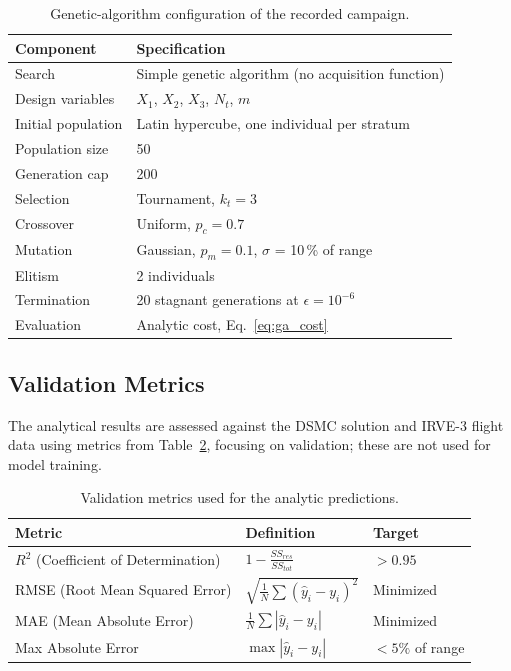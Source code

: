 \begin{table}[H]
    \centering
    \caption{Genetic-algorithm configuration of the recorded campaign.}
    \label{tab:ga_hparams}
    \begin{tabular}{|l|l|}
        \hline
        \textbf{Component} & \textbf{Specification} \\ \hline
        Search & Simple genetic algorithm (no acquisition function) \\ \hline
        Design variables & $X_1$, $X_2$, $X_3$, $N_t$, $m$ \\ \hline
        Initial population & Latin hypercube, one individual per stratum \\ \hline
        Population size & 50 \\ \hline
        Generation cap & 200 \\ \hline
        Selection & Tournament, $k_t = 3$ \\ \hline
        Crossover & Uniform, $p_c = 0.7$ \\ \hline
        Mutation & Gaussian, $p_m = 0.1$, $\sigma$ = 10\,\% of range \\ \hline
        Elitism & 2 individuals \\ \hline
        Termination & 20 stagnant generations at $\epsilon = 10^{-6}$ \\ \hline
        Evaluation & Analytic cost, Eq.~\eqref{eq:ga_cost} \\ \hline
    \end{tabular}
\end{table}

\subsection{Validation Metrics}
The analytical results are assessed against the DSMC solution and IRVE-3 flight data using metrics from Table~\ref{tab:ml_metrics}, focusing on validation; these are not used for model training.

\begin{table}[H]
    \centering
    \caption{Validation metrics used for the analytic predictions.}
    \label{tab:ml_metrics}
    \begin{tabular}{|l|l|l|}
        \hline
        \textbf{Metric} & \textbf{Definition} & \textbf{Target} \\ \hline
        $R^2$ (Coefficient of Determination) & $1 - \frac{SS_{res}}{SS_{tot}}$ & $> 0.95$ \\ \hline
        RMSE (Root Mean Squared Error) & $\sqrt{\frac{1}{N}\sum(\hat{y}_i - y_i)^2}$ & Minimized \\ \hline
        MAE (Mean Absolute Error) & $\frac{1}{N}\sum|\hat{y}_i - y_i|$ & Minimized \\ \hline
        Max Absolute Error & $\max|\hat{y}_i - y_i|$ & $< 5\%$ of range \\ \hline
    \end{tabular}
\end{table}

